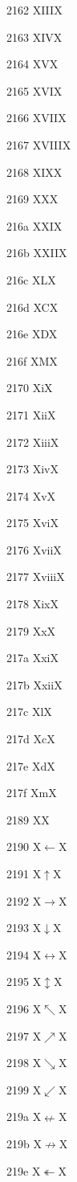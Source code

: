 \documentclass[11pt]{article}
\begin{document}
2162 X{III}X

2163 X{IV}X

2164 X{V}X

2165 X{VI}X

2166 X{VII}X

2167 X{VIII}X

2168 X{IX}X

2169 X{X}X

216a X{XI}X

216b X{XII}X

216c X{L}X

216d X{C}X

216e X{D}X

216f X{M}X

2170 X{i}X

2171 X{ii}X

2172 X{iii}X

2173 X{iv}X

2174 X{v}X

2175 X{vi}X

2176 X{vii}X

2177 X{viii}X

2178 X{ix}X

2179 X{x}X

217a X{xi}X

217b X{xii}X

217c X{l}X

217d X{c}X

217e X{d}X

217f X{m}X

2189 X{}X

2190 X{\ensuremath{\leftarrow}}X

2191 X{\ensuremath{\uparrow}}X

2192 X{\ensuremath{\rightarrow}}X

2193 X{\ensuremath{\downarrow}}X

2194 X{\ensuremath{\leftrightarrow}}X

2195 X{\ensuremath{\updownarrow}}X

2196 X{\ensuremath{\nwarrow}}X

2197 X{\ensuremath{\nearrow}}X

2198 X{\ensuremath{\searrow}}X

2199 X{\ensuremath{\swarrow}}X

219a X{\ensuremath{\nleftarrow}}X

219b X{\ensuremath{\nrightarrow}}X

219e X{\ensuremath{\twoheadleftarrow}}X
\end{document}
